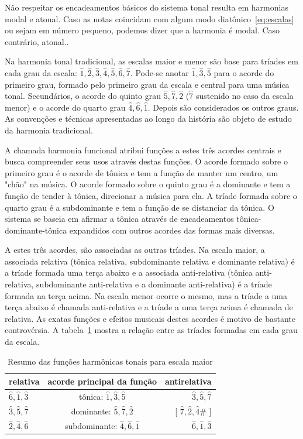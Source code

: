 Não respeitar 
os encadeamentos básicos do sistema tonal resulta
em harmonias modal e atonal. Caso
as notas coincidam com algum modo diatônico~\ref{eq:escalas}
ou sejam em número pequeno, podemos dizer que a
harmonia é modal. Caso contrário, atonal.\cite{harmEXT}.

Na harmonia tonal tradicional,
as escalas maior e menor são
base para tríades em cada grau 
da escala: $\hat{1},\hat{2},\hat{3},\hat{4},\hat{5},\hat{6},\hat{7}$.
Pode-se anotar $\hat{1},\hat{3},\hat{5}$ para o acorde do primeiro grau, formado pelo primeiro grau da escala e central para uma música tonal. Secundários, o acorde do quinto grau $\hat{5},\hat{7},\hat{2}$ ($\hat{7}$ sustenido no caso da escala menor) e o acorde do quarto grau $\hat{4},\hat{6},\hat{1}$. Depois são considerados os outros graus. As convenções e técnicas apresentadas ao longo da história 
são objeto de estudo da harmonia tradicional.\cite{Harmonia}

A chamada harmonia funcional atribui funções a estes três acordes centrais e busca compreender seus usos através destas funções. O acorde formado sobre o primeiro grau é o acorde de tônica e tem a função de manter um centro, um "chão" na música. O acorde formado sobre o quinto grau é a dominante e tem a função de tender à tônica, direcionar a música para ela. A tríade formada sobre o quarto grau é a subdominante e tem a função de se distanciar da tônica. O sistema se baseia em afirmar a tônica através de encadeamentos tônica-dominante-tônica expandidos com outros acordes das formas mais diversas.


A estes três acordes, são associadas as outras tríades. Na escala maior, a associada relativa (tônica relativa, subdominante relativa e dominante relativa) é a tríade formada uma terça abaixo e a associada anti-relativa (tônica anti-relativa, subdominante anti-relativa e a dominante anti-relativa) é a tríade formada na terça acima. Na escala menor ocorre o mesmo, mas a tríade a uma terça abaixo é chamada anti-relativa e a tríade a uma terça acima é chamada de relativa. As exatas funções e efeitos musicais destes acordes é motivo de bastante controvérsia. A tabela~\ref{tab:harmonia} mostra a relação entre as tríades formadas em cada grau da escala.

\begin{table}[htpq!]
\centering
\begin{tabular}{l | c | r}
relativa & acorde principal da função & antirelativa \\\hline\hline
$\hat{6},\hat{1},\hat{3}$ & tônica:       $\hat{1},\hat{3},\hat{5}$ & $\hat{3}, \hat{5},      \hat{7}$ \\
$\hat{3},\hat{5},\hat{7}$ & dominante:    $\hat{5},\hat{7},\hat{2}$ & [ $\hat{7},\hat{2},\hat{4}\#$ ] \\
$\hat{2},\hat{4},\hat{6}$ & subdominante: $\hat{4},\hat{6},\hat{1}$ & $\hat{6},\hat{1},       \hat{3}$
\end{tabular}
\caption{Resumo das funções harmônicas tonais para escala maior}
\label{tab:harmonia}
\end{table}


